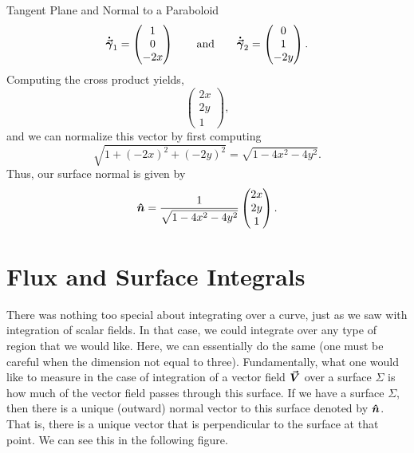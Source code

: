 \begin{ex}{Tangent Plane and Normal to a Paraboloid}
                                        \[
                                        \boldsymbol{\dot{\vec{\gamma}}}_1 = \begin{pmatrix} 1 \\ 0 \\ -2x \end{pmatrix} \qquad \textrm{and} \qquad \boldsymbol{\dot{\vec{\gamma}}}_2 = \begin{pmatrix} 0 \\ 1 \\ -2y \end{pmatrix}.
                                        \]
                                        Computing the cross product yields,
                                        \[
                                        \begin{pmatrix} 2x \\ 2y \\ 1 \end{pmatrix},
                                        \]
                                        and we can normalize this vector by first computing
                                        \[
                                        \sqrt{1+(-2x)^2+(-2y)^2} = \sqrt{1-4x^2-4y^2}.
                                        \]
                                        Thus, our surface normal is given by
                                        \[
                                        \boldsymbol{\hat{n}} = \frac{1}{\sqrt{1-4x^2-4y^2}} \begin{pmatrix} 2x \\ 2y \\ 1 \end{pmatrix}.
                                        \]
                                        \end{ex}
   \section{Flux and Surface Integrals}

       	There was nothing too special about integrating over a curve, just as we saw with integration of scalar fields. In that case, we could integrate over any type of region that we would like.  Here, we can essentially do the same (one must be careful when the dimension not equal to three).  Fundamentally, what one would like to measure in the case of integration of a vector field $\boldsymbol{\vec{V}}$ over a surface $\Sigma$ is how much of the vector field passes through this surface.  If we have a surface $\Sigma$, then there is a unique (outward) normal vector to this surface denoted by $\boldsymbol{\hat{n}}$. That is, there is a unique vector that is perpendicular to the surface at that point. We can see this in the following figure.

